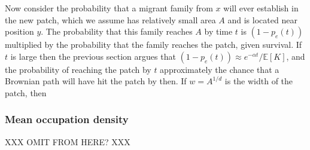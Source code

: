 \documentclass{article}
\newcommand{\E}{\mathbb{E}}
\begin{document}
Now consider the probability that a migrant family from $x$ will ever establish in the new patch,
which we assume has relatively small area $A$ and is located near position $y$.
The probability that this family reaches $A$ by time $t$ is $(1-p_e(t))$
multiplied by the probability that the family reaches the patch, given survival.
If $t$ is large then the previous section argues that $(1-p_e(t)) \approx e^{-\alpha t}/\E[K]$,
and the probability of reaching the patch by $t$ approximately the chance that a Brownian path
will have hit the patch by then.
If $w = A^{1/d}$ is the width of the patch, then 


\subsubsection*{Mean occupation density}

XXX OMIT FROM HERE? XXX
\end{document}
